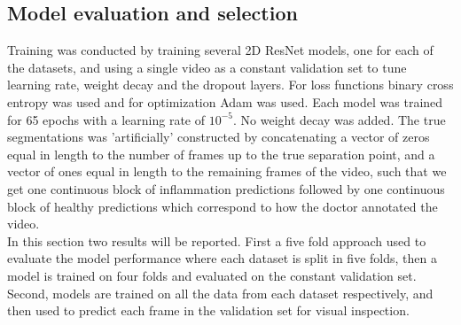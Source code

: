 \subsection{Model evaluation and selection} \label{modelRes}
Training was conducted by training several 2D ResNet models, one for each of the datasets, and using a single video as a constant validation set to tune learning rate, weight decay and the dropout layers. For loss functions binary cross entropy was used and for optimization Adam was used. Each model was trained for 65 epochs with a learning rate of $10^{-5}$. No weight decay was added. The true segmentations was 'artificially' constructed by concatenating a vector of zeros equal in length to the number of frames up to the true separation point, and a vector of ones equal in length to the remaining frames of the video, such that we get one continuous block of inflammation predictions followed by one continuous block of healthy predictions which correspond to how the doctor annotated the video.\\ 
In this section two results will be reported. First a five fold approach used to evaluate the model performance where each dataset is split in five folds, then a model is trained on four folds and evaluated on the constant validation set. Second, models are trained on all the data from each dataset respectively, and then used to predict each frame in the validation set for visual inspection.

